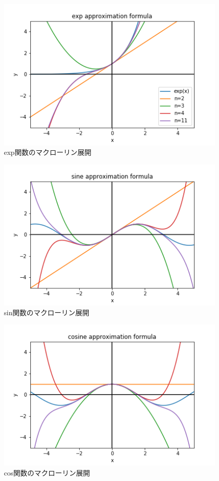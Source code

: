 \documentclass[11pt,a4paper,uplatex]{ujreport} 	%
\begin{document}
\begin{figure}[H]
\label{im:exp}
  \centering
  \includegraphics[width=120mm,bb=0 0 432 288]{figures/exp.png}
  \caption{exp関数のマクローリン展開}
\end{figure}
\begin{figure}[H]
\label{im:sine}
  \centering
  \includegraphics[width=120mm,bb=0 0 432 288]{figures/sine.png}
  \caption{sin関数のマクローリン展開}
\end{figure}

\begin{figure}[H]
\label{im:cosine}
  \centering
  \includegraphics[width=120mm,bb=0 0 432 288]{figures/cosine.png}
  \caption{cos関数のマクローリン展開}
\end{figure}
\end{document}
